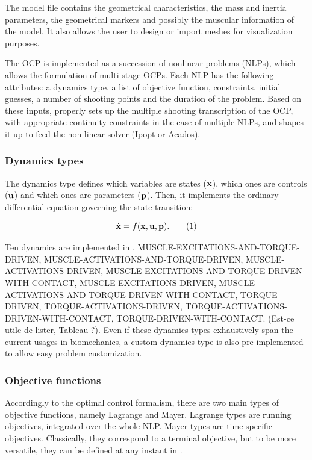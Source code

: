 The model file contains the geometrical characteristics, the mass and inertia parameters, the geometrical markers and possibly the muscular information of the model. 
It also allows the user to design or import meshes for visualization purposes.

The OCP is implemented as a succession of nonlinear problems (NLPs), which allows the formulation of multi-stage OCPs. Each NLP has the following attributes: a dynamics type, a list of objective function, constraints, initial guesses, a number of shooting points and the duration of the problem.
Based on these inputs, \bioptim properly sets up the multiple shooting transcription of the OCP, with appropriate continuity constraints in the case of multiple NLPs, and shapes it up to feed the non-linear solver (Ipopt or Acados). 

\subsubsection{Dynamics types}
The dynamics type defines which variables are states ($\mathbf{x}$), which ones are controls ($\mathbf{u}$) and which ones are parameters ($\mathbf{p}$).
Then, it implements the ordinary differential equation governing the state transition:

\[
\dstate = f(\state, \control, \param).
\addtag
\label{eq:state_transition}
\]

\noindent Ten dynamics are implemented in \bioptim,
MUSCLE-EXCITATIONS-AND-TORQUE-DRIVEN, 
MUSCLE-ACTIVATIONS-AND-TORQUE-DRIVEN,
MUSCLE-ACTIVATIONS-DRIVEN,
MUSCLE-EXCITATIONS-AND-TORQUE-DRIVEN-WITH-CONTACT, 
MUSCLE-EXCITATIONS-DRIVEN,
MUSCLE-ACTIVATIONS-AND-TORQUE-DRIVEN-WITH-CONTACT,
TORQUE-DRIVEN,
TORQUE-ACTIVATIONS-DRIVEN, 
TORQUE-ACTIVATIONS-DRIVEN-WITH-CONTACT, 
TORQUE-DRIVEN-WITH-CONTACT.
(Est-ce utile de lister, Tableau ?).
Even if these dynamics types exhaustively span the current usages in biomechanics, a custom dynamics type is also pre-implemented to allow easy problem customization.

\subsubsection{Objective functions}
Accordingly to the optimal control formalism, there are two main types of objective functions, namely Lagrange and Mayer. Lagrange types are running objectives, integrated over the whole NLP. Mayer types are time-specific objectives. Classically, they correspond to a terminal objective, but to be more versatile, they can be defined at any instant in \bioptim.

